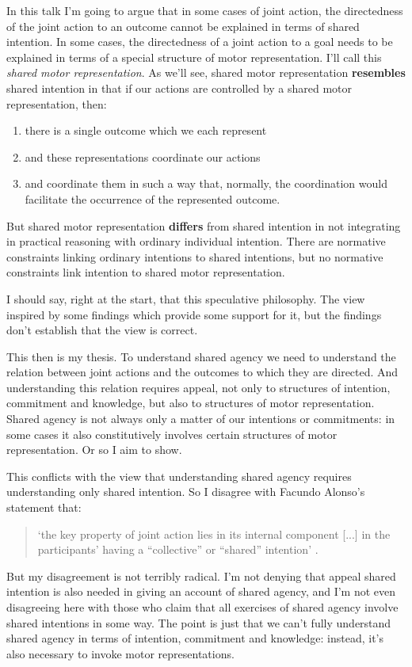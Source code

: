 \documentclass[12pt,\papersize]{extarticle}
\begin{document}
In this talk I'm going to argue that in some cases of joint action,
the directedness of the joint action to an outcome cannot be explained in terms of shared intention.
In some cases, the directedness of a joint action to a goal needs to be explained in terms of a special structure of motor representation.
I'll call this \emph{shared motor representation}.
As we'll see,
shared motor representation \textbf{resembles} shared intention in that if our actions are controlled by a shared motor representation, then:
%
\begin{enumerate}
\item there is a single outcome which we each represent 
\item and these representations coordinate our actions
\item and coordinate them in such a way that, normally,  the coordination would facilitate the occurrence of the represented outcome. 
\end{enumerate}
%
But shared motor representation \textbf{differs} from shared intention in not integrating in practical reasoning with ordinary individual intention.
There are normative constraints linking ordinary intentions to shared intentions,
but no  normative constraints link intention to shared motor representation.

I should say, right at the start, that this speculative philosophy.
The view inspired by some findings which provide some support for it, but the findings don't establish that the view is correct.

This then is my thesis.
To understand shared agency we need to understand the relation between joint actions and the  outcomes to which they are directed.
And understanding this relation requires appeal, not only to structures of intention, commitment and knowledge, 
but also to structures of motor representation.
Shared agency is not always only a matter of our intentions or commitments: in some cases it also constitutively involves certain structures of motor representation.
Or so I aim to show.


This conflicts with the view that understanding shared agency requires understanding only shared intention.
So I disagree with Facundo Alonso's statement that:
%
\begin{quote}
`the key property of joint action lies in its internal component [...] in the participants' having a ``collective'' or ``shared'' intention' \citep[pp.\ 444-5]{alonso_shared_2009}.
\end{quote}
%
But my disagreement is not terribly radical.
I'm not denying that appeal shared intention is also needed in giving an account of shared agency,  
and I'm not even disagreeing here with those who claim that all exercises of shared agency involve shared intentions in some way.
The point is just that we can't fully understand shared agency in terms of intention, commitment and knowledge:
instead, it's also necessary to invoke motor representations.
\end{document}
